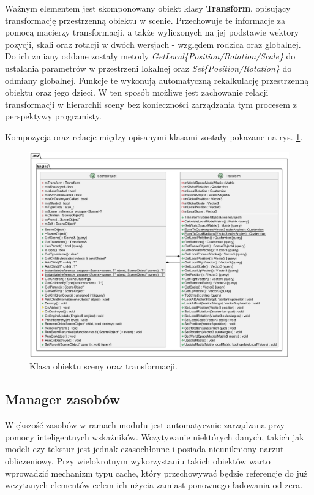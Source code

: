 	Ważnym elementem jest skomponowany obiekt klasy \textbf{Transform}, opisujący transformację przestrzenną obiektu w scenie. Przechowuje te informacje za pomocą macierzy transformacji, a także wyliczonych na jej podstawie wektory pozycji, skali oraz rotacji w dwóch wersjach - względem rodzica oraz globalnej. Do ich zmiany oddane zostały metody \textit{GetLocal\{Position/Rotation/Scale\}} do ustalania parametrów w przestrzeni lokalnej oraz \textit{Set\{Position/Rotation\}} do odmiany globalnej. Funkcje te wykonują automatyczną rekalkulację przestrzenną obiektu oraz jego dzieci. W ten sposób możliwe jest zachowanie relacji transformacji w hierarchii sceny bez konieczności zarządzania tym procesem z perspektywy programisty.
	
	Kompozycja oraz relacje między opisanymi klasami zostały pokazane na rys. \ref{UML_SceneObject}.
	
	\vfill
	\clearpage
	
	\begin{figure}[h!]
		\centering
		\includegraphics[width=\textwidth]{images/UML/sceneobject.png}
		\caption{Klasa obiektu sceny oraz transformacji.}
		\label{UML_SceneObject}
	\end{figure}
	
\subsection{Manager zasobów}
	Większość zasobów w ramach modułu jest automatycznie zarządzana przy pomocy inteligentnych wskaźników. Wczytywanie niektórych danych, takich jak modeli czy tekstur jest jednak czasochłonne i posiada nieunikniony narzut obliczeniowy. Przy wielokrotnym wykorzystaniu takich obiektów warto wprowadzić mechanizm typu cache, który przechowywać będzie referencje do już wczytanych elementów celem ich użycia zamiast ponownego ładowania od zera.
	
